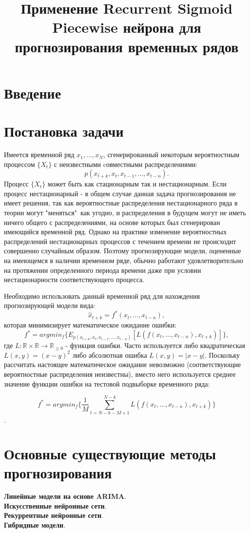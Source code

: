\documentclass[11pt]{article}
\title{\textbf{Применение Recurrent Sigmoid Piecewise нейрона для прогнозирования временных рядов}}
\date{}
\begin{document}
\maketitle
\thispagestyle{empty}

\section*{Введение}
\section*{Постановка задачи}

Имеется временной ряд ${x_1, ..., x_N}$, сгенерированный некоторым вероятностным процессом $ \{X_t\} $ с неизвестными cовместными распределениями:
$$ p(x_{t+k}, x_{t}, x_{t-1}, ..., x_{t-n}). $$
Процесс $ \{X_t\} $ может быть как стационарным так и нестационарным. Если процесс нестационарный - в общем случае данная задача прогнозирования не имеет решения, так как вероятностные распределения нестационарного ряда в теории могут "меняться"\ как угодно, и распределения в будущем могут не иметь ничего общего с распределениями, на основе которых был сгенерирован имеющийся временной ряд. Однако на практике изменение вероятностных распределений нестационарных процессов с течением времени не происходит совершенно случайным образом. Поэтому прогнозирующие модели, оцененные на имеющемся в наличии временном ряде, обычно работают удовлетворительно на протяжении определенного периода времени даже при условии нестационарности соответствующего процесса.

Необходимо использовать данный временной ряд для нахождения прогнозирующей модели вида:
$$ \hat{x}_{t+k} = f^*(x_{t}, ..., x_{t-n}), $$
которая минимизирует математическое ожидание ошибки:
$$ f^* = argmin_f \{ E_{p(x_{t+k}, x_{t}, x_{t-1}, ..., x_{t-n})} [ L(f(x_{t}, ..., x_{t-n}), x_{t+k}) ] \}, $$
где $L: \mathbb{R} \times \mathbb{R} \to \mathbb{R}_{\geq 0} $ - функция ошибки. Часто используется либо квадратическая $ L(x, y) = (x-y)^2 $ либо абсолютная ошибка $ L(x, y) = |x-y| $. Поскольку рассчитать настоящее математическое ожидание невозможно (соответствующие вероятностные распределения неизвестны), вместо него используется среднее значение функции ошибки на тестовой подвыборке временного ряда:

$$ f^* = argmin_f \{ \frac{1}{M} \sum_{t=N-k-M+1}^{N - k}{L(f(x_t, ..., x_{t-n}), x_{t+k})} \} $$.

\section*{Основные существующие методы прогнозирования}
\textbf{Линейные модели на основе ARIMA}.
\\
\textbf{Искусственные нейронные сети}.
\\
\textbf{Рекуррентные нейронные сети}.
\\
\textbf{Гибридные модели}.
\\
\end{document}
